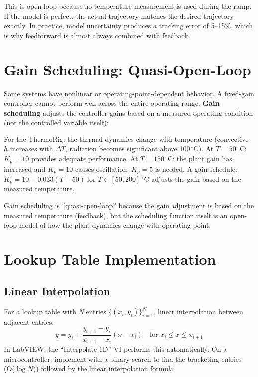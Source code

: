 \documentclass[11pt,letterpaper,twoside,openany]{book}
\newcommand{\degC}{\ensuremath{{}^{\circ}\text{C}}}
\begin{document}
This is open-loop because no temperature measurement is used during the ramp. If the model is perfect, the actual trajectory matches the desired trajectory exactly. In practice, model uncertainty produces a tracking error of 5--15\%, which is why feedforward is almost always combined with feedback.

\section{Gain Scheduling: Quasi-Open-Loop}
Some systems have nonlinear or operating-point-dependent behavior. A fixed-gain controller cannot perform well across the entire operating range. \textbf{Gain scheduling} adjusts the controller gains based on a measured operating condition (not the controlled variable itself):

For the ThermoRig: the thermal dynamics change with temperature (convective $h$ increases with $\Delta T$, radiation becomes significant above 100\,\degC{}). At $T = 50$\,\degC{}: $K_p = 10$ provides adequate performance. At $T = 150$\,\degC{}: the plant gain has increased and $K_p = 10$ causes oscillation; $K_p = 5$ is needed. A gain schedule: $K_p = 10 - 0.033(T - 50)$ for $T \in [50, 200]$\,\degC{} adjusts the gain based on the measured temperature.

Gain scheduling is ``quasi-open-loop'' because the gain adjustment is based on the measured temperature (feedback), but the scheduling function itself is an open-loop model of how the plant dynamics change with operating point.
\section{Lookup Table Implementation}
\subsection{Linear Interpolation}
For a lookup table with $N$ entries $\{(x_i, y_i)\}_{i=1}^{N}$, linear interpolation between adjacent entries:
\begin{equation}
y = y_i + \frac{y_{i+1} - y_i}{x_{i+1} - x_i}(x - x_i) \quad \text{for } x_i \leq x \leq x_{i+1}
\end{equation}
In LabVIEW: the ``Interpolate 1D'' VI performs this automatically. On a microcontroller: implement with a binary search to find the bracketing entries (O($\log N$)) followed by the linear interpolation formula.
\end{document}
